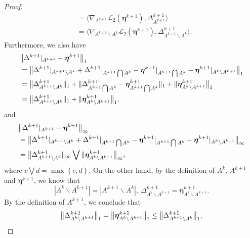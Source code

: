 \documentclass[12pt]{article}
\newcommand{\bb}{\Delta}
\newcommand{\boldeta}{\boldsymbol{\eta}}
\begin{document}
\begin{appendix}
\begin{proof}
\begin{equation*}
\begin{split}
&=\langle\nabla_{A^{k+1}}\mathcal{L}_2(\boldeta^{k+1}), \bb_{A^{k+1}}^{k+1}\rangle\\
&=\langle\nabla_{A^{k+1}\backslash A^{k}}\mathcal{L}_2(\boldeta^{k+1}), \bb_{A^{k+1}\backslash A^{k}}^{k+1}\rangle.
\end{split}
\end{equation*}
Furthermore, we also have
\begin{equation*}
\begin{split}
&\big{\|}\bb^{k+1}|_{A^{k+1}}-\boldeta^{k+1}\big{\|}_1\\
&=\big{\|}\bb^{k+1}|_{A^{k+1}\backslash A^{k}}+\bb^{k+1}|_{A^{k+1}\bigcap A^{k}}-\boldeta^{k+1}|_{A^{k+1}\bigcap A^{k}}-\boldeta^{k+1}|_{A^{k}\backslash A^{k+1}}\big{\|}_1\\
&=\big{\|}\bb_{A^{k+1}\backslash A^{k}}^{k+1}\|_1+\|\bb_{A^{k+1}\bigcap A^{k}}^{k+1}-\boldeta_{A^{k+1}\bigcap A^{k}}^{k+1}\|_1+\|\boldeta_{A^{k}\backslash A^{k+1}}^{k+1}\big{\|}_1\\
&=\big{\|}\bb_{A^{k+1}\backslash A^{k}}^{k+1}\|_1+\|\boldeta_{A^{k}\backslash A^{k+1}}^{k+1}\big{\|}_1,
\end{split}
\end{equation*}
and
\begin{equation*}
\begin{split}
&\big{\|}\bb^{k+1}|_{A^{k+1}}-\boldeta^{k+1}\big{\|}_{\infty}\\
&=\big{\|}\bb^{k+1}|_{A^{k+1}\backslash A^{k}}+\bb^{k+1}|_{A^{k+1}\bigcap A^{k}}-\boldeta^{k+1}|_{A^{k+1}\bigcap A^{k}}-\boldeta^{k+1}|_{A^{k}\backslash A^{k+1}}\big{\|}_{\infty}\\
&=\big{\|}\bb_{A^{k+1}\backslash A^{k}}^{k+1}\|_{\infty}\bigvee\|\boldeta_{A^{k}\backslash A^{k+1}}^{k+1}\big{\|}_{\infty},
\end{split}
\end{equation*}
where $c\bigvee d=\max\left\{c,d\right\}$.
On the other hand, by the definition of $A^k$, $A^{k+1}$ and $\boldeta^{k+1}$, we know that
\begin{equation*}
|A^{k}\backslash A^{k+1}|=|A^{k+1}\backslash A^{k}|,~ \bb_{A^{k}\backslash A^{k+1}}^{k+1}=\boldeta_{A^{k}\backslash A^{k+1}}^{k+1}.
\end{equation*}
By the definition of $A^{k+1}$, we conclude that
\begin{equation*}
\big{\|}\bb_{A^{k}\backslash A^{k+1}}^{k+1}\big{\|}_1=\big{\|}\boldeta_{A^{k}\backslash A^{k+1}}^{k+1}\big{\|}_1\leq \big{\|}\bb_{A^{k+1}\backslash A^{k}}^{k+1}\big{\|}_1,
\end{equation*}

\end{proof}
\end{appendix}
\end{document}
